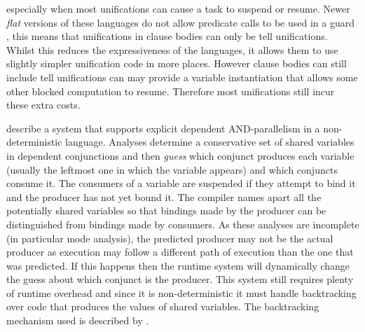 especially when most unifications can cause a task to suspend or resume.
Newer \emph{flat} versions of these languages
do not allow predicate calls to be used in a guard
\citep*{taylor:flat_concur_prolog,foster:1987:flat_parlog,modedghc},
this means that unifications in clause bodies can only be tell unifications.
Whilst this reduces the expressiveness of the languages,
it allows them to use
slightly simpler unification code in more places.
However clause bodies can still include tell unifications can may provide a
variable instantiation that allows some other blocked computation to resume.
Therefore most unifications still incur these extra costs.

\citet{pontelli:1996:nondet-and-par} describe a system that 
supports explicit dependent AND-parallelism in a non-deterministic language.
Analyses determine a conservative set of shared variables in dependent
conjunctions and then \emph{guess} which conjunct produces each variable
(usually the leftmost one in which the variable appears)
and which conjuncts consume it.
The consumers of a variable are suspended if they attempt to bind it and the
producer has not yet bound it.
The compiler names apart all the potentially shared variables so
that bindings made by the producer can be distinguished
from bindings made by consumers.
As these analyses are incomplete (in particular mode analysis),
the predicted producer may not be the actual producer as execution may
follow a different path of execution than the one that was predicted.
If this happens then the runtime system will dynamically change the guess
about which conjunct is the producer.
This system still requires plenty of runtime overhead and since it is
non-deterministic it must handle backtracking over code that produces the
values of shared variables.
The backtracking mechanism used is described by \citet{shen:1996:daswam}.

